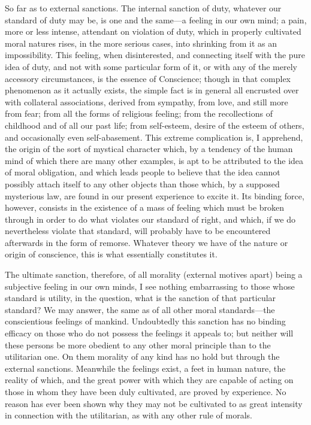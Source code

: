 \documentclass[12pt]{report}
\begin{document}
So far as to external sanctions. The internal sanction of duty, whatever our standard of duty may be, is one and the same—a feeling in our own mind; a pain, more or less intense, attendant on violation of duty, which in properly cultivated moral natures rises, in the more serious cases, into shrinking from it as an impossibility. This feeling, when disinterested, and connecting itself with the pure idea of duty, and not with some particular form of it, or with any of the merely accessory circumstances, is the essence of Conscience; though in that complex phenomenon as it actually exists, the simple fact is in general all encrusted over with collateral associations, derived from sympathy, from love, and still more from fear; from all the forms of religious feeling; from the recollections of childhood and of all our past life; from self-esteem, desire of the esteem of others, and occasionally even self-abasement. This extreme complication is, I apprehend, the origin of the sort of mystical character which, by a tendency of the human mind of which there are many other examples, is apt to be attributed to the idea of moral obligation, and which leads people to believe that the idea cannot possibly attach itself to any other objects than those which, by a supposed mysterious law, are found in our present experience to excite it. Its binding force, however, consists in the existence of a mass of feeling which must be broken through in order to do what violates our standard of right, and which, if we do nevertheless violate that standard, will probably have to be encountered afterwards in the form of remorse. Whatever theory we have of the nature or origin of conscience, this is what essentially constitutes it.

The ultimate sanction, therefore, of all morality (external motives apart) being a subjective feeling in our own minds, I see nothing embarrassing to those whose standard is utility, in the question, what is the sanction of that particular standard? We may answer, the same as of all other moral standards—the conscientious feelings of mankind. Undoubtedly this sanction has no binding efficacy on those who do not possess the feelings it appeals to; but neither will these persons be more obedient to any other moral principle than to the utilitarian one. On them morality of any kind has no hold but through the external sanctions. Meanwhile the feelings exist, a feet in human nature, the reality of which, and the great power with which they are capable of acting on those in whom they have been duly cultivated, are proved by experience. No reason has ever been shown why they may not be cultivated to as great intensity in connection with the utilitarian, as with any other rule of morals.
\end{document}
